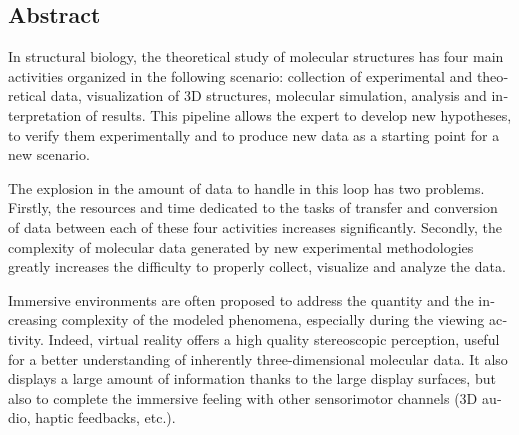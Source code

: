 \begin{otherlanguage}{english}
%
\subsection*{Abstract}
\footnotesize

In structural biology, the theoretical study of molecular structures has four main activities organized in the following scenario: collection of experimental and theoretical data, visualization of 3D structures, molecular simulation, analysis and interpretation of results. This pipeline allows the expert to develop new hypotheses, to verify them experimentally and to produce new data as a starting point for a new scenario.

The explosion in the amount of data to handle in this loop has two problems. Firstly, the resources and time dedicated to the tasks of transfer and conversion of data between each of these four activities increases significantly. Secondly, the complexity of molecular data generated by new experimental methodologies greatly increases the difficulty to properly collect, visualize and analyze the data.

Immersive environments are often proposed to address the quantity and the increasing complexity of the modeled phenomena, especially during the viewing activity. Indeed, virtual reality offers a high quality stereoscopic perception, useful for a better understanding of inherently three-dimensional molecular data. It also displays a large amount of information thanks to the large display surfaces, but also to complete the immersive feeling with other sensorimotor channels (3D audio, haptic feedbacks, etc.).


\end{otherlanguage}
